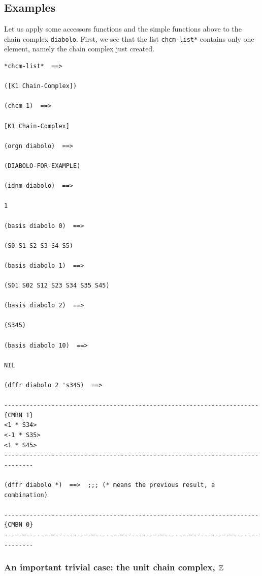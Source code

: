 \subsection* {Examples}

Let us apply some accessors functions and the simple  functions above to the chain complex {\tt diabolo}.
First, we see that the list {\tt *chcm-list*} contains only one element, namely the chain complex
just created.
{\footnotesize\begin{verbatim}
*chcm-list*  ==>

([K1 Chain-Complex])

(chcm 1)  ==>

[K1 Chain-Complex]

(orgn diabolo)  ==>

(DIABOLO-FOR-EXAMPLE)

(idnm diabolo)  ==>

1

(basis diabolo 0)  ==>

(S0 S1 S2 S3 S4 S5)

(basis diabolo 1)  ==>

(S01 S02 S12 S23 S34 S35 S45)

(basis diabolo 2)  ==>

(S345)

(basis diabolo 10)  ==>

NIL

(dffr diabolo 2 's345)  ==>

----------------------------------------------------------------------{CMBN 1}
<1 * S34>
<-1 * S35>
<1 * S45>
------------------------------------------------------------------------------

(dffr diabolo *)  ==>  ;;; (* means the previous result, a combination)

----------------------------------------------------------------------{CMBN 0}
------------------------------------------------------------------------------
\end{verbatim}}
\newpage

\subsubsection{An important trivial case: the unit chain complex, ${\Bbb Z}$}


